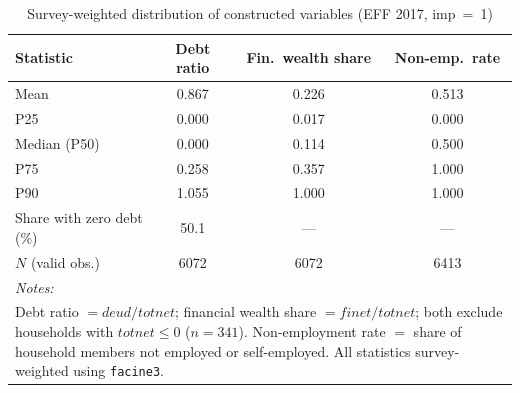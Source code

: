 \begin{table}[!h]

\caption{\label{tab:dist_constructed}Survey-weighted distribution of constructed variables (EFF 2017, imp~=~1)}
\centering
\begin{tabular}[t]{lccc}
\toprule
Statistic & Debt ratio & Fin.\ wealth share & Non-emp.\ rate\\
\midrule
Mean & 0.867 & 0.226 & 0.513\\
P25 & 0.000 & 0.017 & 0.000\\
Median (P50) & 0.000 & 0.114 & 0.500\\
P75 & 0.258 & 0.357 & 1.000\\
P90 & 1.055 & 1.000 & 1.000\\
\addlinespace
Share with zero debt (\%) & 50.1 & --- & ---\\
$N$ (valid obs.) & 6072 & 6072 & 6413\\
\bottomrule
\multicolumn{4}{l}{\rule{0pt}{1em}\textit{Notes: }}\\
\multicolumn{4}{l}{\rule{0pt}{1em}Debt ratio $= \mathit{deud}/\mathit{totnet}$; financial wealth share $= \mathit{finet}/\mathit{totnet}$; both exclude households with $\mathit{totnet} \leq 0$ ($n = 341$). Non-employment rate $=$ share of household members not employed or self-employed. All statistics survey-weighted using \texttt{facine3}.}\\
\end{tabular}
\end{table}
